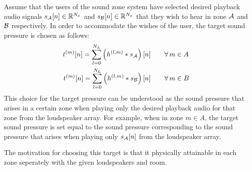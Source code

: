 Assume that the users of the sound zone system have selected desired playback audio signals $s_{\mathcal{A}}[n]\in\mathbb{R}^{N_x}$ and
$s_{\mathcal{B}}[n]\in\mathbb{R}^{N_x}$ that they wish to hear in zone $\mathcal{A}$ and $\mathcal{B}$ respectively.
In order to accommodate the wishes of the user, the target sound pressure is chosen as follows: 
\begin{align}
    t^{(m)}[n] = \sum_{l=0}^{N_L} \left(h^{(l,m)} \ast s_{\mathcal{A}}\right)[n]\qquad &\forall\,m\in A\\
    t^{(m)}[n] = \sum_{l=0}^{N_L} \left(h^{(l,m)} \ast s_{\mathcal{B}}\right)[n]\qquad &\forall\,m\in B
\end{align}
This choice for the target pressure can be understood as the sound pressure that arises in a certain zone
when playing only the desired playback audio for that zone from the loudspeaker array. 
For example, when in zone $m\in A$, the target sound pressure is set equal to the sound pressure corresponding to 
the sound pressure that arises when playing only $s_{\mathcal{A}}[n]$ from the loudspeaker array.

The motivation for choosing this target is that it physically attainable in each zone seperately
with the given loudspeakers and room.

